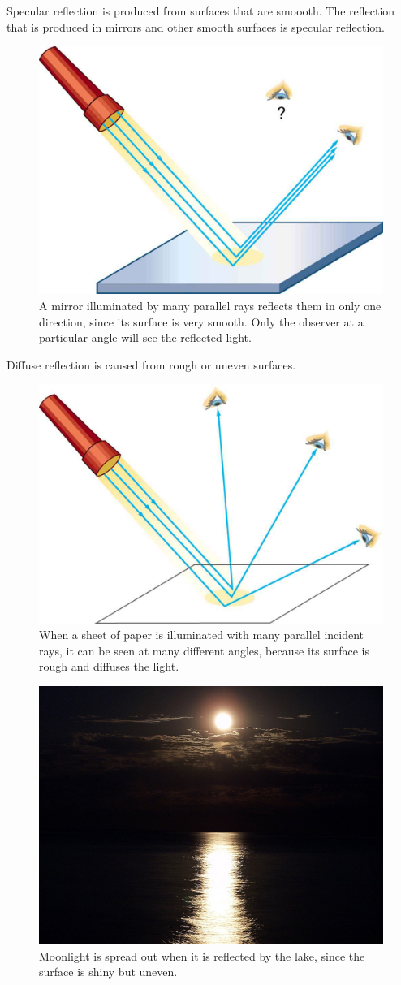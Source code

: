 \documentclass[12pt]{book}
\begin{document}
Specular reflection is produced from surfaces that are smoooth.
The reflection that is produced in mirrors and other smooth surfaces is specular reflection.
\begin{figure}[htpb]
    \centering
    \includegraphics[width=0.5\linewidth]{../specular.jpeg}
    \caption{ A mirror illuminated by many parallel rays reflects them in only one direction, since its surface is very smooth. Only the observer at a particular angle will see the reflected light.}%
    \label{fig:}
\end{figure}
Diffuse reflection is caused from rough or uneven surfaces.
\begin{figure}[htpb]
    \centering
    \includegraphics[width=0.5\linewidth]{../diffuse.jpeg}
    \caption{When a sheet of paper is illuminated with many parallel incident rays, it can be seen at many different angles, because its surface is rough and diffuses the light.}%
    \label{fig:}
\end{figure}
\begin{figure}[htpb]
    \centering
    \includegraphics[width=0.8\linewidth]{../moonlight.jpeg}
    \caption{ Moonlight is spread out when it is reflected by the lake, since the surface is shiny but uneven.}%
    \label{fig:}
\end{figure}
\end{document}
